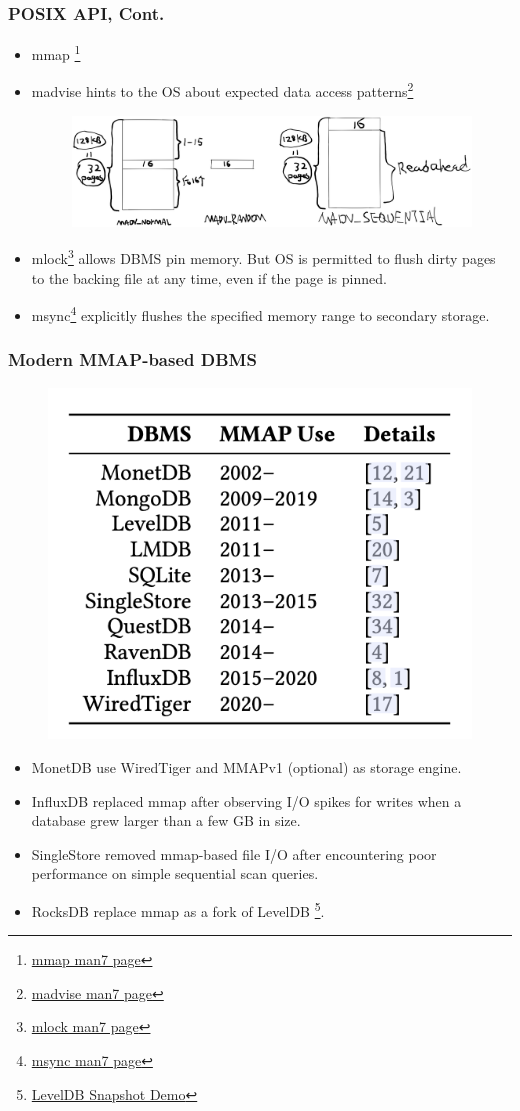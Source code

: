 \documentclass[10pt,svgnames,fragile]{beamer}
\begin{document}
\begin{frame}
	\frametitle{POSIX API, Cont.}
	\begin{itemize}
		\item mmap \footnote[frame]{\href{https://man7.org/linux/man-pages/man2/mmap.2.html}{mmap man7 page}}
		\item madvise hints to the OS about expected data access patterns\footnote[frame]{\href{https://man7.org/linux/man-pages/man2/madvise.2.html}{madvise man7 page}}
		\begin{figure}[h]
			\includegraphics[width=0.99\linewidth]{images/readahead.png}
		\end{figure}
		\item mlock\footnote[frame]{\href{https://man7.org/linux/man-pages/man2/mlock.2.html}{mlock man7 page}} allows DBMS pin memory. {\color{red}But OS is permitted to flush dirty pages to the backing file at any time, even if the page is pinned.}
		\item msync\footnote[frame]{\href{https://man7.org/linux/man-pages/man2/msync.2.html}{msync man7 page}} explicitly flushes the specified memory range to secondary storage.
	\end{itemize}
\end{frame}

\begin{frame}
	\frametitle{Modern MMAP-based DBMS}
	\begin{figure}[h]
		\includegraphics[width=0.35\linewidth]{images/mmap.png}
	\end{figure}
	\pause
	\begin{itemize}
		\item<1-> MonetDB use WiredTiger and MMAPv1 (optional) as storage engine.
		\item<2-> InfluxDB replaced mmap after observing I/O spikes for writes when a database grew larger than a few GB in size.
		\item<3-> SingleStore removed mmap-based file I/O after encountering poor performance on simple sequential scan queries.
		\item<4-> RocksDB replace mmap as a fork of LevelDB
		\footnote[frame]{\href{https://github.com/Ethanzjp/Snippets/tree/master/Level_Snapshot}{LevelDB Snapshot Demo}}.
	\end{itemize}
\end{frame}
\end{document}
